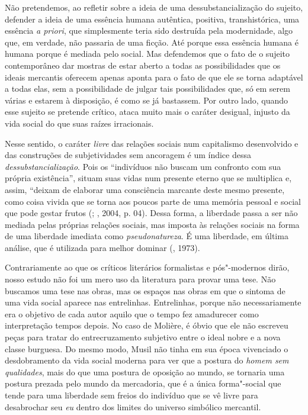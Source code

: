 Não pretendemos, ao refletir sobre a ideia de uma dessubstancialização
do sujeito, defender a ideia de uma essência humana autêntica, positiva,
transhistórica, uma essência \emph{a priori}, que simplesmente teria
sido destruída pela modernidade, algo que, em verdade, não passaria de
uma ficção. Até porque essa essência humana é humana porque é mediada
pelo social. Mas defendemos que o fato de o sujeito contemporâneo dar
mostras de estar aberto a todas as possibilidades que os ideais
mercantis oferecem apenas aponta para o fato de que ele se torna
adaptável a todas elas, sem a possibilidade de julgar tais
possibilidades que, só em serem várias e estarem à disposição, é como se
já bastassem. Por outro lado, quando esse sujeito se pretende crítico,
ataca muito mais o caráter desigual, injusto da vida social do que suas
raízes irracionais.

Nesse sentido, o caráter \emph{livre} das relações sociais num
capitalismo desenvolvido e das construções de subjetividades sem
ancoragem é um índice dessa \emph{dessubstancialização}. Pois os
``indivíduos não buscam um confronto com sua própria existência'',
situam suas vidas num presente eterno que se multiplica e, assim,
``deixam de elaborar uma consciência marcante deste mesmo presente, como
coisa vivida que se torna aos poucos parte de uma memória pessoal e
social que pode gestar frutos (; , 2004, p. 04). Dessa forma,
a liberdade passa a ser não mediada pelas próprias relações sociais, mas
imposta às relações sociais na forma de uma liberdade imediata como
\emph{pseudonatureza}. É uma liberdade, em última análise, que é
utilizada para melhor dominar (, 1973).

Contrariamente ao que os críticos literários formalistas e pós"-modernos
dirão, nosso estudo não foi um mero uso da literatura para provar uma
tese. Não buscamos uma tese nas obras, mas os espaços nas obras em que o
sintoma de uma vida social aparece nas entrelinhas. Entrelinhas, porque
não necessariamente era o objetivo de cada autor aquilo que o tempo fez
amadurecer como interpretação tempos depois. No caso de Molière, é óbvio
que ele não escreveu peças para tratar do entrecruzamento subjetivo
entre o ideal nobre e a nova classe burguesa. Do mesmo modo, Musil não
tinha em sua época vivenciado o desdobramento da vida social moderna
para ver que a postura do \emph{homem sem qualidades}, mais do que uma
postura de oposição ao mundo, se tornaria uma postura prezada pelo mundo
da mercadoria, que é a única forma"-social que tende para uma liberdade
sem freios do indivíduo que se vê livre para desabrochar seu \emph{eu}
dentro dos limites do universo simbólico mercantil.

